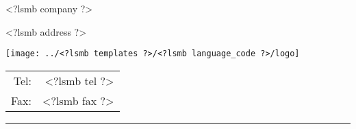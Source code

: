 \parbox{\textwidth}{%
  \parbox[b]{.42\textwidth}{%
    <?lsmb company ?>
   
    <?lsmb address ?>
  }
  \parbox[b]{.2\textwidth}{
    \texttt{[image: ../<?lsmb templates ?>/<?lsmb language\_code ?>/logo]}
  }\hfill
  \begin{tabular}[b]{rr@{}}
  Tel: & <?lsmb tel ?>\\
  Fax: & <?lsmb fax ?>
  \end{tabular}

  \rule[1.5em]{\textwidth}{0.5pt}
}

